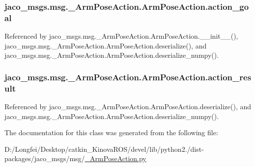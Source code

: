 \subsubsection[{\texorpdfstring{action\+\_\+goal}{action_goal}}]{\setlength{\rightskip}{0pt plus 5cm}jaco\+\_\+msgs.\+msg.\+\_\+\+Arm\+Pose\+Action.\+Arm\+Pose\+Action.\+action\+\_\+goal}\hypertarget{classjaco__msgs_1_1msg_1_1__ArmPoseAction_1_1ArmPoseAction_ababc0bb07c8926c3e8d55dfd2ddacdf4}{}\label{classjaco__msgs_1_1msg_1_1__ArmPoseAction_1_1ArmPoseAction_ababc0bb07c8926c3e8d55dfd2ddacdf4}


Referenced by jaco\+\_\+msgs.\+msg.\+\_\+\+Arm\+Pose\+Action.\+Arm\+Pose\+Action.\+\_\+\+\_\+init\+\_\+\+\_\+(), jaco\+\_\+msgs.\+msg.\+\_\+\+Arm\+Pose\+Action.\+Arm\+Pose\+Action.\+deserialize(), and jaco\+\_\+msgs.\+msg.\+\_\+\+Arm\+Pose\+Action.\+Arm\+Pose\+Action.\+deserialize\+\_\+numpy().

\subsubsection[{\texorpdfstring{action\+\_\+result}{action_result}}]{\setlength{\rightskip}{0pt plus 5cm}jaco\+\_\+msgs.\+msg.\+\_\+\+Arm\+Pose\+Action.\+Arm\+Pose\+Action.\+action\+\_\+result}\hypertarget{classjaco__msgs_1_1msg_1_1__ArmPoseAction_1_1ArmPoseAction_a15c3aa8e8baead8d23478de23af61ca0}{}\label{classjaco__msgs_1_1msg_1_1__ArmPoseAction_1_1ArmPoseAction_a15c3aa8e8baead8d23478de23af61ca0}


Referenced by jaco\+\_\+msgs.\+msg.\+\_\+\+Arm\+Pose\+Action.\+Arm\+Pose\+Action.\+deserialize(), and jaco\+\_\+msgs.\+msg.\+\_\+\+Arm\+Pose\+Action.\+Arm\+Pose\+Action.\+deserialize\+\_\+numpy().



The documentation for this class was generated from the following file\+:\begin{DoxyCompactItemize}
\item 
D\+:/\+Longfei/\+Desktop/catkin\+\_\+\+Kinova\+R\+O\+S/devel/lib/python2./dist-\/packages/jaco\+\_\+msgs/msg/\hyperlink{__ArmPoseAction_8py}{\+\_\+\+Arm\+Pose\+Action.\+py}\end{DoxyCompactItemize}
